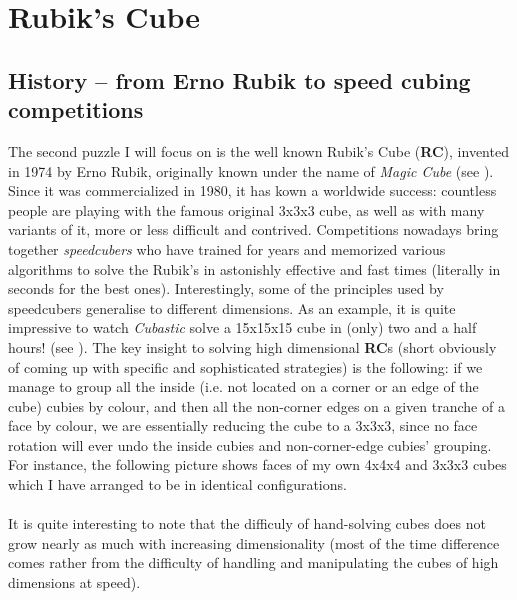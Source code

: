 \section{Rubik's Cube}



\subsection{History -- from Erno Rubik to speed cubing competitions}
The second puzzle I will focus on is the well known Rubik's Cube (\textbf{RC}), invented in 1974 by Erno Rubik, originally known under the name of \textit{Magic Cube} (see \cite{RubiksWiki}). Since it was commercialized in 1980, it has kown a worldwide success: countless people are playing with the famous original 3x3x3 cube, as well as with many variants of it, more or less difficult and contrived. Competitions nowadays bring together \textit{speedcubers} who have trained for years and memorized various algorithms to solve the Rubik's in astonishly effective and fast times (literally in seconds for the best ones). Interestingly, some of the principles used by speedcubers generalise to different dimensions. As an example, it is quite impressive to watch \textit{Cubastic} solve a 15x15x15 cube in (only) two and a half hours! (see \cite{151515Rubiks}). The key insight to solving high dimensional \textbf{RC}s (short obviously of coming up with specific and sophisticated strategies) is the following: if we manage to group all the inside (i.e. not located on a corner or an edge of the cube) cubies by colour, and then all the non-corner edges on a given tranche of a face by colour, we are essentially reducing the cube to a 3x3x3, since no face rotation will ever undo the inside cubies and non-corner-edge cubies' grouping. For instance, the following picture shows faces of my own 4x4x4 and 3x3x3 cubes which I have arranged to be in identical configurations.
\\
\\
It is quite interesting to note that the difficuly of hand-solving cubes does not grow nearly as much with increasing dimensionality (most of the time difference comes rather from the difficulty of handling and manipulating the cubes of high dimensions at speed). 


